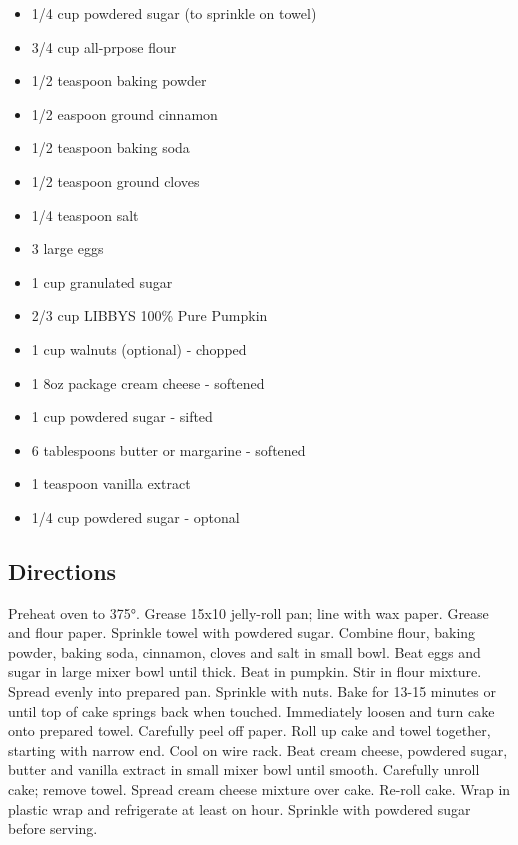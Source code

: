 \documentclass[
]{book}
\providecommand{\tightlist}{%
  \setlength{\itemsep}{0pt}\setlength{\parskip}{0pt}}
\begin{document}
\begin{itemize}
\tightlist
\item
  1/4 cup powdered sugar (to sprinkle on towel)
\item
  3/4 cup all-prpose flour
\item
  1/2 teaspoon baking powder
\item
  1/2 easpoon ground cinnamon
\item
  1/2 teaspoon baking soda
\item
  1/2 teaspoon ground cloves
\item
  1/4 teaspoon salt
\item
  3 large eggs
\item
  1 cup granulated sugar
\item
  2/3 cup LIBBYS 100\% Pure Pumpkin
\item
  1 cup walnuts (optional) - chopped
\item
  1 8oz package cream cheese - softened
\item
  1 cup powdered sugar - sifted
\item
  6 tablespoons butter or margarine - softened
\item
  1 teaspoon vanilla extract
\item
  1/4 cup powdered sugar - optonal
\end{itemize}

\hypertarget{directions-88}{%
\subsection*{Directions}\label{directions-88}}


Preheat oven to 375°. Grease 15x10 jelly-roll pan; line with wax paper. Grease and flour paper. Sprinkle towel with powdered sugar. Combine flour, baking powder, baking soda, cinnamon, cloves and salt in small bowl. Beat eggs and sugar in large mixer bowl until thick. Beat in pumpkin. Stir in flour mixture. Spread evenly into prepared pan. Sprinkle with nuts. Bake for 13-15 minutes or until top of cake springs back when touched. Immediately loosen and turn cake onto prepared towel. Carefully peel off paper. Roll up cake and towel together, starting with narrow end. Cool on wire rack. Beat cream cheese, powdered sugar, butter and vanilla extract in small mixer bowl until smooth. Carefully unroll cake; remove towel. Spread cream cheese mixture over cake. Re-roll cake. Wrap in plastic wrap and refrigerate at least on hour. Sprinkle with powdered sugar before serving.
\end{document}
